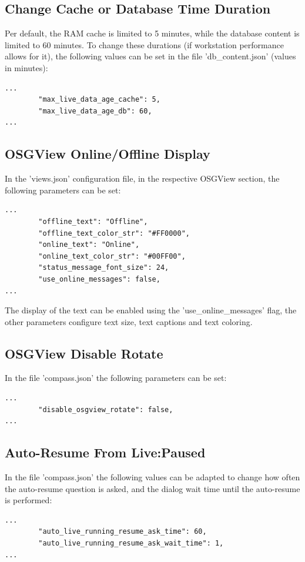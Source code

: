 \subsection{Change Cache or Database Time Duration}

Per default, the RAM cache is limited to 5 minutes, while the database content is limited to 60 minutes. To change these durations (if workstation performance allows for it), the following values can be set in the file 'db\_content.json' (values in minutes):

\begin{lstlisting}
...
        "max_live_data_age_cache": 5,
        "max_live_data_age_db": 60,
...        
\end{lstlisting}

\subsection{OSGView Online/Offline Display}
\label{sec:live_online_offline}

In the 'views.json' configuration file, in the respective OSGView section, the following parameters can be set:

\begin{lstlisting}
...
        "offline_text": "Offline",
        "offline_text_color_str": "#FF0000",
        "online_text": "Online",
        "online_text_color_str": "#00FF00",
        "status_message_font_size": 24,
        "use_online_messages": false,        
...        
\end{lstlisting}

The display of the text can be enabled using the 'use\_online\_messages' flag, the other parameters configure text size, text captions and text coloring.

\subsection{OSGView Disable Rotate}

In the file 'compass.json' the following parameters can be set:

\begin{lstlisting}
...
        "disable_osgview_rotate": false,
...        
\end{lstlisting}

\subsection{Auto-Resume From Live:Paused}
\label{sec:live_paused_resume}

In the file 'compass.json' the following values can be adapted to change how often the auto-resume question is asked, and the dialog wait time until the auto-resume is performed:

\begin{lstlisting}
...
        "auto_live_running_resume_ask_time": 60,
        "auto_live_running_resume_ask_wait_time": 1,
...        
\end{lstlisting}


